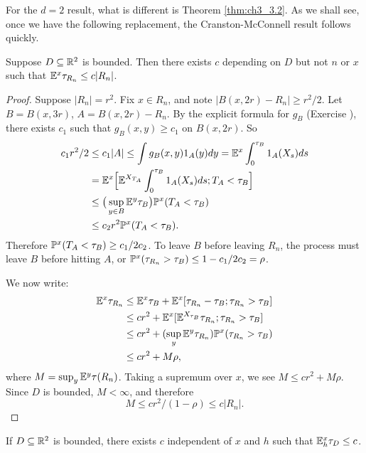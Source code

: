 

For the $d = 2$ result, what is different is Theorem \ref{thm:ch3_3.2}. As we shall see, once we have the following replacement, the Cranston-McConnell result follows quickly.

\begin{theorem}\label{thm:ch3_3.4}
Suppose $D \subseteq \R^2$ is bounded. Then there exists $c$ depending on $D$ but not $n$ or $x$ such that $\E^x\tau_{R_n} \leq c|R_n|$.
\end{theorem}

\begin{proof}
Suppose $|R_n| = r^2$. Fix $x \in R_n$, and note $|B(x,2r) - R_n| \geq r^2/2$. Let $B = B(x,3r)$, $A = B(x,2r) - R_n$. By the explicit formula for $g_B$ (Exercise ), there exists $c_1$ such that $g_B(x,y) \geq c_1$ on $B(x,2r)$. So
\begin{align*}
    c_1r^2/2 &\leq c_1|A| \leq \int g_B(x,y)1_A(y)dy = \E^x \int_0^{\tau_B} 1_A(X_s)ds \\
    &= \E^x\Big[\E^{X_{T_A}} \int_0^{\tau_B} 1_A(X_s)ds; T_A < \tau_B\Big] \\
    &\leq \big(\sup_{y\in B} \E^y\tau_B\big)\P^x(T_A < \tau_B) \\
    &\leq c_2r^2\P^x(T_A < \tau_B).
\end{align*}
Therefore $\P^x(T_A < \tau_B) \geq c_1/2c_2$. To leave $B$ before leaving $R_n$, the process must leave $B$ before hitting $A$, or $\P^x(\tau_{R_n} > \tau_B) \leq 1 - c_1/2c_2 = \rho$.

We now write:
\begin{align*}
    \E^x\tau_{R_n} &\leq \E^x\tau_B + \E^x[\tau_{R_n} - \tau_B; \tau_{R_n} > \tau_B] \\
    &\leq cr^2 + \E^x[\E^{X_{\tau_B}}\tau_{R_n}; \tau_{R_n} > \tau_B] \\
    &\leq cr^2 + (\sup_{y} \E^y\tau_{R_n})\P^x(\tau_{R_n} > \tau_B) \\
    &\leq cr^2 + M\rho,
\end{align*}
where $M = \sup_y \E^y\tau(R_n)$. Taking a supremum over $x$, we see $M \leq cr^2 + M\rho$. Since $D$ is bounded, $M < \infty$, and therefore
\[
    M \leq cr^2/(1-\rho) \leq c|R_n|.
\]
\end{proof}

\begin{theorem}\label{thm:ch3_3.5}
If $D \subseteq \R^2$ is bounded, there exists $c$ independent of $x$ and $h$ such that $\E_h^x\tau_D \leq c$.
\end{theorem}

